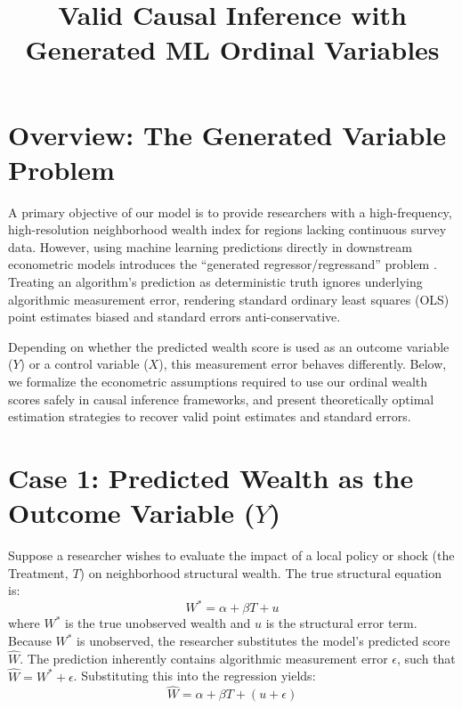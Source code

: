 \documentclass[11pt]{article}
\title{\textbf{Valid Causal Inference with Generated ML Ordinal Variables}}
\author{}
\date{}
\begin{document}
\maketitle

\section*{Overview: The Generated Variable Problem}

A primary objective of our model is to provide researchers with a high-frequency, high-resolution neighborhood wealth index for regions lacking continuous survey data. However, using machine learning predictions directly in downstream econometric models introduces the ``generated regressor/regressand'' problem \citep{knox2022testing}. Treating an algorithm's prediction as deterministic truth ignores underlying algorithmic measurement error, rendering standard ordinary least squares (OLS) point estimates biased and standard errors anti-conservative.

Depending on whether the predicted wealth score is used as an outcome variable ($Y$) or a control variable ($X$), this measurement error behaves differently. Below, we formalize the econometric assumptions required to use our ordinal wealth scores safely in causal inference frameworks, and present theoretically optimal estimation strategies to recover valid point estimates and standard errors.

\section{Case 1: Predicted Wealth as the Outcome Variable ($Y$)}

Suppose a researcher wishes to evaluate the impact of a local policy or shock (the Treatment, $T$) on neighborhood structural wealth. The true structural equation is:
\begin{equation}
    W^* = \alpha + \beta T + u
\end{equation}
where $W^*$ is the true unobserved wealth and $u$ is the structural error term. Because $W^*$ is unobserved, the researcher substitutes the model's predicted score $\hat{W}$. The prediction inherently contains algorithmic measurement error $\epsilon$, such that $\hat{W} = W^* + \epsilon$. Substituting this into the regression yields:
\begin{equation}
    \hat{W} = \alpha + \beta T + (u + \epsilon)
\end{equation}
\end{document}
